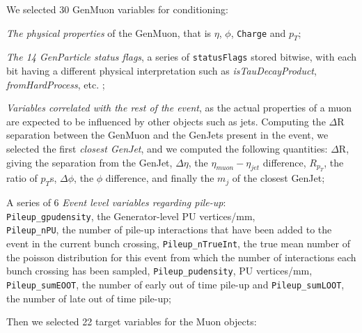 We selected 30 GenMuon variables for conditioning:

\begin{outline}
\1 \emph{The physical properties} of the GenMuon, that is $\eta$, $\phi$, \texttt{Charge} and $p_T$;

\1 \emph{The 14 GenParticle status flags}, a series of \texttt{statusFlags} stored bitwise, with each bit having a different physical interpretation such as \emph{isTauDecayProduct}, \emph{fromHardProcess}, etc. ;

\1 \emph{Variables correlated with the rest of the event}, as the actual properties of a muon are expected to be influenced by other objects such as jets. Computing the $\Delta$R separation between the GenMuon and the GenJets present in the event, we selected the first \emph{closest GenJet}, and we computed the following quantities:
\2 $\Delta$R, giving the separation from the GenJet, $\Delta\eta$, the $\eta_{muon} - \eta_{jet}$ difference, $R_{p_T}$, the ratio of $p_T$s, $\Delta\phi$, the $\phi$ difference, and finally the $m_j$ of the closest GenJet;

\1 A series of 6 \emph{ Event level variables regarding pile-up}:\\ \texttt{Pileup\_gpudensity}, the Generator-level PU vertices/mm,\\ \texttt{Pileup\_nPU}, the number of pile-up interactions that have been added to the event in the current bunch crossing, \texttt{Pileup\_nTrueInt}, the true mean number of the poisson distribution for this event from which the number of interactions each bunch crossing has been sampled, \texttt{Pileup\_pudensity}, PU vertices/mm, \texttt{Pileup\_sumEOOT}, the number of early out of time pile-up and \texttt{Pileup\_sumLOOT}, the number of late out of time pile-up;
\end{outline}

Then we selected 22 target variables for the Muon objects:

